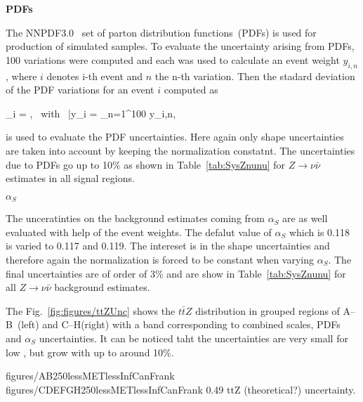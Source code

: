 
\textbf{PDFs}


The NNPDF3.0~\cite{Ball:2014uwa} set of parton distribution functions~(PDFs) is used for production of simulated samples. To evaluate the uncertainty arising from PDFs, 100 variations were computed and each was used to calculate an event weight $y_{i,n}$, where $i$ denotes i-th event and $n$ the n-th variation. Then the stadard deviation of the PDF variations for an event $i$ computed as

{
\sigma_{i} = , ~with~ \bar{y}_{i} =  \sum_{n=1}^{100} y_{i,n},
}

is used to evaluate the PDF uncertainties. Here again only shape uncertainties are taken into account by keeping the normalization constatnt. The uncertainties due to PDFs go up to 10\% as shown in Table~\ref{tab:SysZnunu} for $Z \to \nu \bar{\nu}$ estimates in all signal regions.

\textbf{$\alpha_{S}$}

The unceratinties on the background estimates coming from $\alpha_{S}$ are as well evaluated with help of the event weights. The defalut value of $\alpha_{S}$ which is 0.118 is varied to 0.117 and 0.119.  The intereset is in the shape uncertainties and therefore again the normalization is forced to be constant when varying $\alpha_{S}$. The final uncertainties are of order of 3\% and are show in Table~\ref{tab:SysZnunu} for all $Z \to \nu \bar{\nu}$ background estimates.


The Fig.~\ref{fig:figures/ttZUnc} shows the $t\bar{t}Z$ \MET distribution in grouped regions of A--B~(left) and C--H(right) with a band corresponding to combined scales, PDFs and $\alpha_{S}$ uncertainties. It can be noticed taht the uncertainties are very small for low \MET, but grow with \MET up to around 10\%.

                 {figures/AB250lessMETlessInfCanFrank} %
                 {figures/CDEFGH250lessMETlessInfCanFrank} %
                 {0.49}       %
                 { ttZ (theoretical?) uncertainty. }


